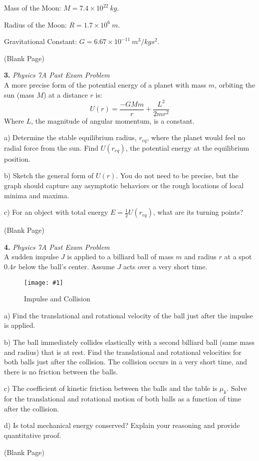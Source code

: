 \documentclass[11pt]{article}
\newcommand{\fig}[4]{
    \begin{figure}[H]
        \centering
        \texttt{[image: \#1]}
        \caption{#2}
        \label{exp4fit}
    \end{figure}
}
\theoremstyle{gangnamstyle}{\newtheorem{definition}{Definition}[]}
\theoremstyle{gangnamstyle}{\newtheorem{example}{Example}[]}
\theoremstyle{gangnamstyle}{\newtheorem{problem}{Problem}[]}
\begin{document}
Mass of the Moon: $M = 7.4 \times 10^{22} \ kg$. 

Radius of the Moon: $R = 1.7 \times 10^{6} \ m$. 

Gravitational Constant: $G = 6.67 \times 10^{-11} \ m^3/kgs^2$. 

\pagebreak

\begin{center}
(Blank Page)
\end{center}

\pagebreak

\textbf{3.} \textit{Physics 7A Past Exam Problem} \\
A more precise form of the potential energy of a planet with mass $m$, orbiting the sun (mass $M$) at a distance $r$ is:
\[ U(r) = \frac{-GMm}{r} + \frac{L^2}{2mr^2} \]
Where $L$, the magnitude of angular momentum, is a constant. 

a) Determine the stable equilibrium radius, $r_{eq}$, where the planet would feel no radial force from the sun. Find $U(r_{eq})$, the potential energy at the equilibrium position. 

b) Sketch the general form of $U(r)$. You do not need to be precise, but the graph should capture any asymptotic behaviors or the rough locations of local minima and maxima. 

c) For an object with total energy $E = \frac{1}{2}U(r_{eq})$, what are its turning points? 

\pagebreak

\begin{center}
(Blank Page)
\end{center}

\pagebreak

\textbf{4.} \textit{Physics 7A Past Exam Problem} \\
A sudden impulse $J$ is applied to a billiard ball of mass $m$ and radius $r$ at a spot $0.4r$ below the ball’s center. Assume $J$ acts over a very short time.

\fig{figs/mt2/tbp5.png}{Impulse and Collision}{0.65}{0}

a) Find the translational and rotational velocity of the ball just after the impulse is applied.

b) The ball immediately collides elastically with a second billiard ball (same mass and radius) that is at rest. Find the translational and rotational velocities for both balls just after the collision. The collision occurs in a very short time, and there is no friction between the balls.

c) The coefficient of kinetic friction between the balls and the table is $\mu_k$. Solve for the translational and rotational motion of both balls as a function of time after the collision.

d) Is total mechanical energy conserved? Explain your reasoning and provide quantitative proof.

\pagebreak

\begin{center}
(Blank Page)
\end{center}

\pagebreak
\end{document}
